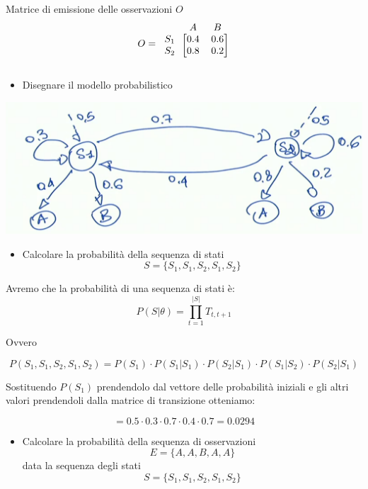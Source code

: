 \documentclass{article}
\begin{document}
Matrice di emissione delle osservazioni  $O$
\[
O = 
\begin{blockarray}{ccc}
		& A & B \\
	\begin{block}{c[cc]}
	S_1 &	0.4  &  0.6   \\
	S_2 &	0.8  &  0.2   \\
	\end{block}
\end{blockarray}
\]	

\begin{itemize}
	\item Disegnare il modello probabilistico
\end{itemize}
	\begin{center}
	\includegraphics[width=14cm]{./immagini/hmm_es2.png}
\end{center}

\begin{itemize}
	\item Calcolare la probabilità della sequenza di stati
	\[
		S = \{ S_1, S_1, S_2, S_1, S_2\}
	\]
\end{itemize}

Avremo che la probabilità di una sequenza di stati è:
\[
P(S | \theta ) = \prod_{t = 1}^{|S|} T_{t, t + 1}
\]

Ovvero

\[
P(S_1, S_1, S_2, S_1, S_2) = 
P(S_1) \cdot 
P(S_1 | S_1) \cdot 
P(S_2 | S_1) \cdot 
P(S_1 | S_2) \cdot 
P(S_2 | S_1) 
\]

Sostituendo $P(S_1)$ prendendolo dal vettore delle probabilità iniziali e gli altri valori prendendoli dalla matrice di transizione otteniamo:

\[
 = 0.5 \cdot 0.3 \cdot 0.7 \cdot 0.4 \cdot 0.7 = 0.0294
\]

\pagebreak

\begin{itemize}
	\item Calcolare la probabilità della sequenza di osservazioni
	\[
	E = \{ A, A, B, A, A\}
	\]
	data la sequenza degli stati
	\[
	S = \{ S_1, S_1, S_2, S_1, S_2 \}
	\]
\end{itemize}
\end{document}
